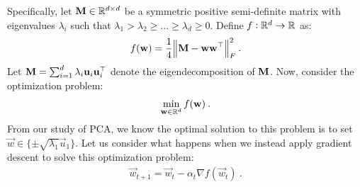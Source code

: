 \documentclass[preview]{standalone}
\begin{document}
Specifically, let $\mathbf{M} \in \mathbb{R}^{d \times d}$ be a symmetric positive semi-definite matrix
with eigenvalues $\lambda_i$ such that $\lambda_1 > \lambda_2 \geq ... \geq \lambda_d \geq 0$.
Define $f : \mathbb{R}^d \rightarrow \mathbb{R}$ as:
\begin{align*}
  f(\boldsymbol{\mathbf{w}}) = \frac{1}{4} \norm{ \mathbf{M} - \boldsymbol{\mathbf{w}}\boldsymbol{\mathbf{w}}^\top }_F^2 \:.
\end{align*}
Let $\mathbf{M} = \sum_{i=1}^{d} \lambda_i \boldsymbol{\mathbf{u}}_i\boldsymbol{\mathbf{u}}_i^\top$ denote the eigendecomposition of $\mathbf{M}$.
Now, consider the optimization problem:
\begin{align*}
  \min_{\boldsymbol{\mathbf{w}} \in \mathbb{R}^d} f(\boldsymbol{\mathbf{w}}) \:.
\end{align*}
From our study of PCA, we know the optimal solution to this
problem is to set $\vec{w} \in \{ \pm \sqrt{\lambda_1} \vec{u}_1 \}$.
Let us consider what happens when we instead apply gradient descent to solve this optimization problem:
\begin{align*}
  \vec{w}_{t+1} = \vec{w}_t - \alpha_t \nabla f(\vec{w}_t) \:.
\end{align*}
\end{document}
